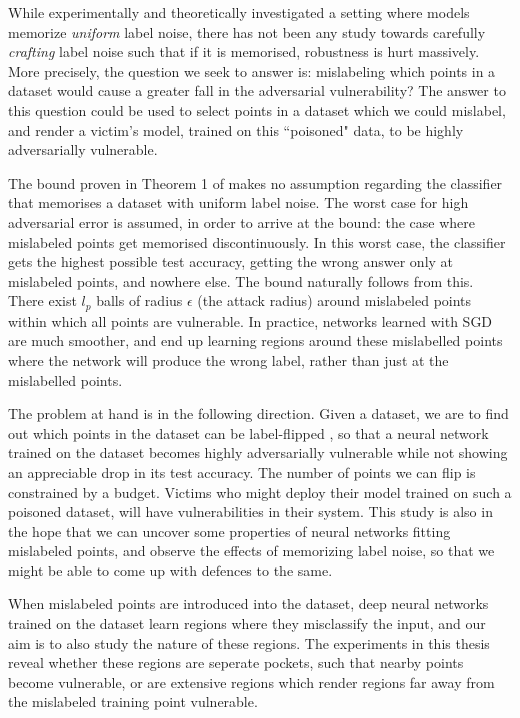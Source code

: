\documentclass[12pt, oneside]{book}
\begin{document}
While \citet{sanyal2021how} experimentally and theoretically investigated a
setting where models memorize \emph{uniform} label noise, there has not been any
study towards carefully \emph{crafting} label noise such that if it is
memorised, robustness is hurt massively. More precisely, the question we seek to
answer is: mislabeling which points in a dataset would cause a greater fall in
the adversarial vulnerability? The answer to this question could be used to
select points in a dataset which we could mislabel, and render a victim's model,
trained on this ``poisoned" data, to be highly adversarially vulnerable.

The bound proven in Theorem 1 of \citet{sanyal2021how} makes no assumption
regarding the classifier that memorises a dataset with uniform label noise. The
worst case for high adversarial error is assumed, in order to arrive at the
bound: the case where mislabeled points get memorised discontinuously. In this
worst case, the classifier gets the highest possible test accuracy, getting the
wrong answer only at mislabeled points, and nowhere else. The bound naturally
follows from this. There exist $l_p$ balls of radius $\epsilon$ (the
attack radius) around mislabeled points within which all points are vulnerable.
In practice, networks learned with SGD are much smoother, and end up learning
regions around these mislabelled points where the network will produce the wrong
label, rather than just at the mislabelled points.

The problem at hand is in the following direction. Given a dataset, we are to
find out which points in the dataset can be label-flipped , so that a neural
network trained on the dataset becomes highly adversarially vulnerable while not
showing an appreciable drop in its test accuracy. The number of points we can
flip is constrained by a budget. Victims who might deploy their model trained on
such a poisoned dataset, will have vulnerabilities in their system. This study
is also in the hope that we can uncover some properties of neural networks
fitting mislabeled points, and observe the effects of memorizing label noise, so
that we might be able to come up with defences to the same.

When mislabeled points are introduced into the dataset, deep neural networks
trained on the dataset learn regions where they misclassify the input, and our
aim is to also study the nature of these regions. The experiments in this thesis
reveal whether these regions are seperate pockets, such that nearby points
become vulnerable, or are extensive regions which render regions far away from
the mislabeled training point vulnerable. 
\end{document}

